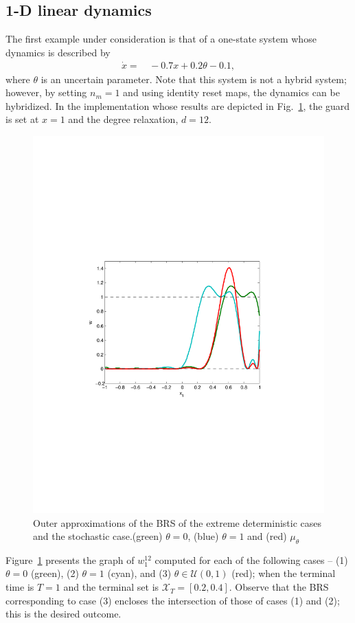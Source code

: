   \subsection{1-D linear dynamics}
  The first example under consideration is that of a one-state system whose dynamics is described by
  \begin{align}
	\dot x =&\, -0.7x+0.2\theta-0.1,
    \label{eq:ex:1}
\end{align}
where $\theta$ is an uncertain parameter. Note that this system is not a hybrid system; however, by setting $n_m=1$ and using identity reset maps, the dynamics can be hybridized. In the implementation whose results are depicted in Fig.~\ref{fig:1D:linear}, the guard is set at $x=1$ and the degree relaxation, $d=12$.
\begin{figure}[!t]
  \includegraphics[width=\columnwidth,trim =1.5in 3.3in 1.5in 3.5in, clip=true]{figures/1D_3}
  \caption{Outer approximations of the BRS of the extreme deterministic cases and the stochastic case.(green) $\theta=0$, (blue) $\theta=1$ and (red) $\mu_\theta$}
    \label{fig:1D:linear}
\end{figure}
\par
Figure~\ref{fig:1D:linear} presents the graph of $w_1^{12}$ computed for each of the following cases -- (1) $\theta=0$ (green), (2) $\theta=1$ (cyan), and (3) $\theta\in \mathcal U(0,1)$ (red); when the terminal time is $T=1$ and the terminal set is $\mathcal X_T=[0.2,0.4]$. Observe that the BRS corresponding to case (3) encloses the intersection of those of cases (1) and (2); this is the desired outcome.
